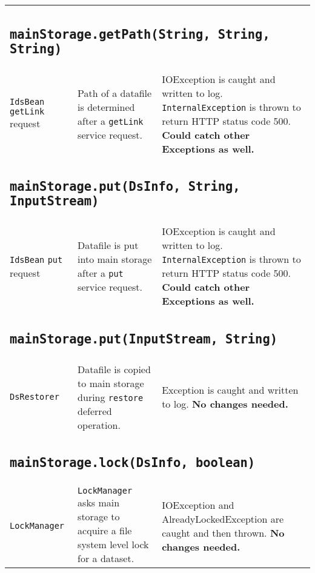 \documentclass[paper=a4]{scrartcl}
\begin{document}
\begin{longtable}{ p{32mm} | p{48mm} | p{48mm} }
    \multicolumn{3}{p{\textwidth}}{
      \subsection{\texttt{mainStorage.getPath(String, String, String)}}
    } \\

    \raggedright \texttt{IdsBean} \texttt{getLink} request &
    \raggedright Path of a datafile is determined after a \texttt{getLink} service request. &
    \raggedright IOException is caught and written to log. \texttt{InternalException} is thrown to return HTTP status code 500. \textbf{Could catch other Exceptions as well.}
    \tabularnewline

    \multicolumn{3}{p{\textwidth}}{
      \subsection{\texttt{mainStorage.put(DsInfo, String, InputStream)}}
    } \\

    \raggedright \texttt{IdsBean} \texttt{put} request &
    \raggedright Datafile is put into main storage after a \texttt{put} service request. &
    \raggedright IOException is caught and written to log. \texttt{InternalException} is thrown to return HTTP status code 500. \textbf{Could catch other Exceptions as well.}
    \tabularnewline

    \multicolumn{3}{p{\textwidth}}{
      \subsection{\texttt{mainStorage.put(InputStream, String)}}
    } \\

    \raggedright \texttt{DsRestorer} &
    \raggedright Datafile is copied to main storage during \texttt{restore} deferred operation. &
    \raggedright Exception is caught and written to log. \textbf{No changes needed.}
    \tabularnewline

    \multicolumn{3}{p{\textwidth}}{
      \subsection{\texttt{mainStorage.lock(DsInfo, boolean)}}
    } \\

    \texttt{LockManager} &
    \raggedright \texttt{LockManager} asks main storage to acquire a file system level lock for a dataset. &
    \raggedright IOException and AlreadyLockedException are caught and then thrown. \textbf{No changes needed.}
    \tabularnewline

\end{longtable}
\end{document}
